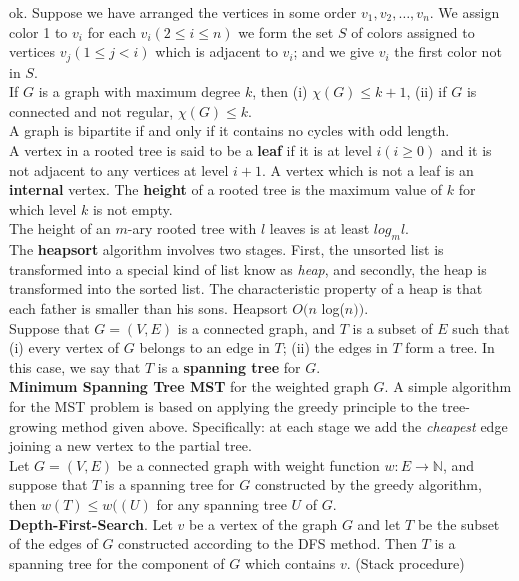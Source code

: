 \documentclass[10pt,landscape]{article}
\begin{document}
\begin{multicols}{3}
ok. Suppose we have arranged the vertices in some order $v_{1}, v_{2},
\dots ,v_{n}$. We assign color 1 to $v_{i}$ for each $v_{i}(2 \leq i
\leq n)$ we form the set $S$ of colors assigned to vertices $v_{j}(1
\leq j < i)$ which is adjacent to $v_{i}$; and we give $v_{i}$ the
first color not in $S$.\\
If $G$ is a graph with maximum degree $k$, then (i) $\chi(G) \leq k +
1$, (ii) if $G$ is connected and not regular, $\chi(G) \leq k$.\\
A graph is bipartite if and only if it contains no cycles with odd length.\\
A vertex in a rooted tree is said to be a \textbf{leaf} if it is at
level $i (i \geq 0)$ and it is not adjacent to any vertices at level
$i + 1$. A vertex which is not a leaf is an \textbf{internal}
vertex. The \textbf{height} of a rooted tree is the maximum value of
$k$ for which level $k$ is not empty.\\
The height of an $m$-ary rooted tree with $l$ leaves is at least
$log_{m}l$.\\
The \textbf{heapsort} algorithm involves two stages. First, the
unsorted list is transformed into a special kind of list know as
\textit{heap}, and secondly, the heap is transformed into the sorted
list. The characteristic property of a heap is that each father is
smaller than his sons. Heapsort $O(n$ log($n))$.\\
Suppose that $G = (V, E)$ is a connected graph, and $T$ is a subset of
$E$ such that (i) every vertex of $G$ belongs to an edge in $T$; (ii)
the edges in $T$ form a tree. In this case, we say that $T$ is a
\textbf{spanning tree} for $G$.\\
\textbf{Minimum Spanning Tree MST} for the weighted graph $G$. A
simple algorithm for the MST problem is based on applying the greedy
principle to the tree-growing method given above. Specifically: at
each stage we add the \textit{cheapest} edge joining a new vertex to
the partial tree.\\
Let $G = (V,E)$ be a connected graph with weight function $w: E \to
\mathbb{N}$, and suppose that $T$ is a spanning tree for $G$
constructed by the greedy algorithm, then $w(T) \leq w((U)$ for any
spanning tree $U$ of $G$.\\
\textbf{Depth-First-Search}. Let $v$ be a vertex of the graph $G$ and
let $T$ be the subset of the edges of $G$ constructed according to the
DFS method. Then $T$ is a spanning tree for the component of $G$ which
contains $v$. (Stack procedure)\\

\end{multicols}
\end{document}
